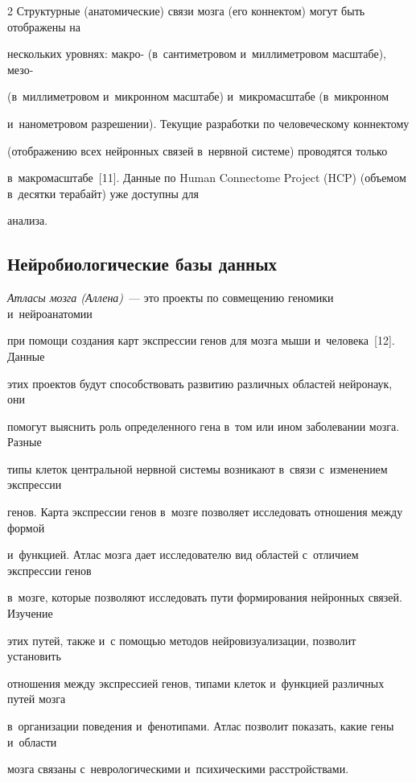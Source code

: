 \begin{multicols}{2}
  Структурные (анатомические) связи мозга (его коннектом) могут быть отображены на 


нескольких уровнях: макро- (в~сантиметровом и~миллиметровом масштабе), мезо- 


(в~миллиметровом и~микронном масштабе) и~микромасштабе (в~микронном 


и~нанометровом разрешении). Текущие разработки по человеческому коннектому 


(отображению всех нейронных связей в~нервной системе) проводятся только 


в~макромасштабе~[11]. Данные по Human Connectome Project (HCP) (объемом в~десятки терабайт) уже доступны для 


анализа. 





\subsection{Нейробиологические базы данных}





  \textit{Атласы мозга (Аллена)}~--- это проекты по совмещению геномики и~нейроанатомии 


при помощи создания карт экспрессии генов для мозга мыши и~человека~[12]. Данные 


этих проектов будут способствовать развитию различных областей нейронаук, они 


помогут выяснить роль определенного гена в~том или ином заболевании мозга. Разные 


типы клеток центральной нервной системы возникают в~связи с~изменением экспрессии 


генов. Карта экспрессии генов в~мозге позволяет исследовать отношения между формой 


и~функцией. Атлас мозга дает исследователю вид областей с~отличием экспрессии генов 


в~мозге, которые позволяют исследовать пути формирования нейронных связей. Изучение 


этих путей, также и~с помощью методов нейровизуализации, позволит установить 


отношения между экспрессией генов, типами клеток и~функцией различных путей мозга 


в~организации поведения и~фенотипами. Атлас позволит показать, какие гены и~области 


мозга связаны с~неврологическими и~психическими расстройствами. 






\end{multicols}
